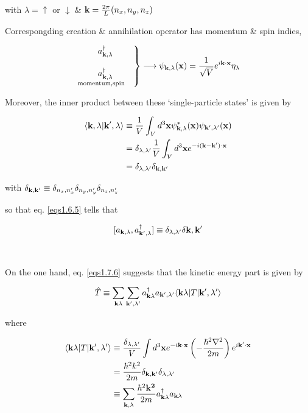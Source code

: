 with $\lambda=\uparrow$ or $\downarrow$ \& ${\bf k}=\frac{2\pi}{L}(n_x,n_y,n_z)$

Correspongding creation \& annihilation operator has momentum \& spin indies, 

\[
\left.\begin{matrix}
a^\dagger_{{\bf k},\lambda} \\
\ \\
\underset{\text{momentum,spin}\quad}{a^\dagger_{{\bf k},{\lambda}}}
\end{matrix}\right\}\longrightarrow\psi_{{\bf k},\lambda}({\bf x})=\frac{1}{\sqrt{V}}e^{i\bf k\cdot x}\eta_\lambda 
\]

Moreover, the inner product between these `single-particle states' is given by

\[\begin{split}
\langle {\bf k},\lambda|{\bf k'},\lambda\rangle&\equiv\frac{1}{V}\int_V d^3{\bf x}\psi_{{\bf k},\lambda}^*({\bf x})\psi_{{\bf k'},\lambda'}({\bf x}) \\
&=\delta_{\lambda,\lambda'}\frac{1}{V}\int_V d^3{\bf x}e^{-i\bf (k-k')\cdot x}\\
&=\delta_{\lambda,\lambda'}\delta_{\bf k,k'}
\end{split}\]

with $\delta_{\bf k,k'}\equiv\delta_{n_x,n_x'}\delta_{n_y,n_y'}\delta_{n_z,n_z'}$

so that eq. \eqref{eqs1.6.5} tells that

\[[a_{{\bf k},\lambda},a^\dagger_{{\bf k'},\lambda}]\equiv\delta_{\lambda,\lambda'}\delta{\bf k,k'} \]

\dotfill

\ 

On the one hand, eq. \eqref{eqs1.7.6} suggests that the kinetic energy part is given by

\[\hat{T}\equiv\sum_{{\bf k}\lambda}\sum_{{\bf k'},\lambda'}a^\dagger_{{\bf k}\lambda} a_{{\bf k'},\lambda'}\langle{\bf k}\lambda|T|{\bf k'},\lambda'\rangle\]

where

\begin{align}\label{eq1.8.11}
\begin{split}
\langle{\bf k}\lambda|T|{\bf k'},\lambda'\rangle&\equiv\frac{\delta_{\lambda,\lambda'}}{V}\int d^3{\bf x}e^{-i\bf k\cdot x}\left(-\frac{\hbar^2\nabla^2}{2m}\right)e^{i\bf k'\cdot x}\\
&=\frac{\hbar^2 k^2}{2m}\delta_{\bf k,k'}\delta_{\lambda,\lambda'}\\
&\equiv\sum_{{\bf k},\lambda}\frac{\hbar^2\bf k^2}{2m}a^\dagger_{{\bf k}\lambda}a_{{\bf k}\lambda}
\end{split}
\end{align}


